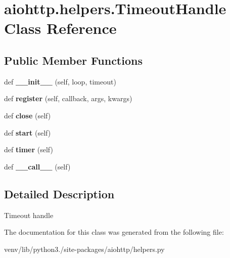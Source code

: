 \hypertarget{classaiohttp_1_1helpers_1_1_timeout_handle}{}\section{aiohttp.\+helpers.\+Timeout\+Handle Class Reference}
\label{classaiohttp_1_1helpers_1_1_timeout_handle}
\subsection*{Public Member Functions}
\begin{DoxyCompactItemize}
\item 
\mbox{\label{classaiohttp_1_1helpers_1_1_timeout_handle_a7f1b2de8738f01001b0fa095c389eeed}} 
def {\bfseries \+\_\+\+\_\+init\+\_\+\+\_\+} (self, loop, timeout)
\item 
\mbox{\label{classaiohttp_1_1helpers_1_1_timeout_handle_acb9fd1275c63cf556e5fc8d129ce6e35}} 
def {\bfseries register} (self, callback, args, kwargs)
\item 
\mbox{\label{classaiohttp_1_1helpers_1_1_timeout_handle_a44f8ea4fb983fdeadc6b046ebc94a514}} 
def {\bfseries close} (self)
\item 
\mbox{\label{classaiohttp_1_1helpers_1_1_timeout_handle_a68b297ade4841672d50bc11d5e5ba7cc}} 
def {\bfseries start} (self)
\item 
\mbox{\label{classaiohttp_1_1helpers_1_1_timeout_handle_a500cd6b9028829e34919218b61a99ddd}} 
def {\bfseries timer} (self)
\item 
\mbox{\label{classaiohttp_1_1helpers_1_1_timeout_handle_a60fd7ff576b3ad503b96ce4566896a16}} 
def {\bfseries \+\_\+\+\_\+call\+\_\+\+\_\+} (self)
\end{DoxyCompactItemize}


\subsection{Detailed Description}
\begin{DoxyVerb}Timeout handle \end{DoxyVerb}
 

The documentation for this class was generated from the following file\+:\begin{DoxyCompactItemize}
\item 
venv/lib/python3./site-\/packages/aiohttp/helpers.\+py\end{DoxyCompactItemize}
